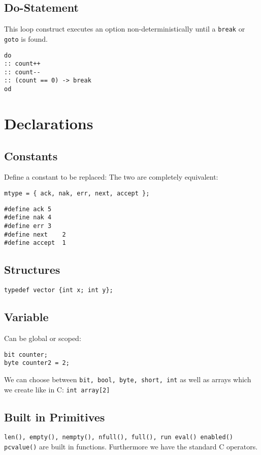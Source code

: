 \documentclass{sciposter}
\begin{document}
\begin{multicols}{3}
\subsection*{Do-Statement}
This loop construct executes an option non-deterministically until a \texttt{break} or \texttt{goto} is found.
\begin{lstlisting}[language=promela]
do
:: count++
:: count--
:: (count == 0) -> break
od
\end{lstlisting}

\section*{Declarations}
\subsection*{Constants}
Define a constant to be replaced: The two are completely equivalent:
\begin{lstlisting}[language=promela]
mtype = { ack, nak, err, next, accept };
\end{lstlisting}
\begin{lstlisting}[language=promela]
#define	ack	5
#define nak	4
#define	err	3
#define next	2
#define accept	1
\end{lstlisting}

\subsection*{Structures}
\begin{lstlisting}[language=promela]
typedef vector {int x; int y};
\end{lstlisting}

\subsection*{Variable}
Can be global or scoped:
\begin{lstlisting}[language=promela]
bit counter;
byte counter2 = 2;
\end{lstlisting}
We can choose between \texttt{bit, bool, byte, short, int} as well as arrays which we create like in C: \texttt{int array[2]}
\subsection*{Built in Primitives}
\texttt{len(), empty(), nempty(), nfull(), full(), run eval() enabled() pcvalue()} are built in functions. Furthermore we have the standard C operators. 


\end{multicols}
\end{document}
